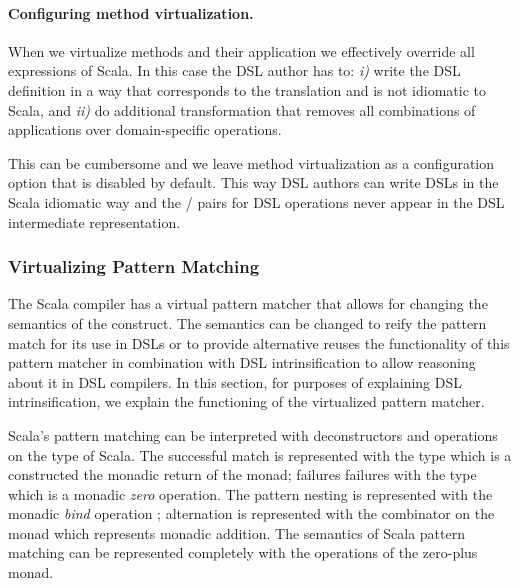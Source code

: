  \paragraph{Configuring method virtualization.} When we virtualize methods and their application
   we effectively override all expressions of Scala. In this case the DSL author has to:
   \emph{i)} write the DSL definition in a way that corresponds to the translation and is not idiomatic to Scala,
   and \emph{ii)} do additional transformation that removes all combinations of applications over domain-specific operations.

   This can be cumbersome and we leave method virtualization as a configuration option that is
    disabled by default. This way DSL authors can write DSLs in the
    Scala idiomatic way and the / pairs for DSL operations never appear in the
    DSL intermediate representation.


\newcommand{\ttname}{\tau}


\newcommand{\ttarg}[1][]{\ttname_{\mathtt{arg}} \ifempty{#1}{}{(#1)}}
\newcommand{\ttother}[1][]{\ttname \ifempty{#1}{}{(#1)}}

\subsubsection{Virtualizing Pattern Matching}
\label{sct:virtpatmat}

The Scala compiler has a virtual pattern matcher that allows for changing the semantics
 of the construct. The semantics can be changed to reify the pattern match for its use
 in DSLs or to provide alternative \yy reuses the functionality of this pattern matcher
 in combination with DSL intrinsification to allow reasoning about it in DSL compilers.
 In this section, for purposes of explaining DSL intrinsification, we explain the functioning
 of the virtualized pattern matcher.

Scala's pattern matching can be interpreted with deconstructors and operations on the 
 type of Scala. The successful match is represented with the  type which is
 a constructed the monadic return of the  monad; failures failures with the
  type which is a monadic \emph{zero} operation.
 The pattern nesting is represented with the monadic \emph{bind} operation ; alternation is represented with the
  combinator on the  monad which represents monadic addition. The semantics
 of Scala pattern matching can be represented completely with the operations of the zero-plus monad.


